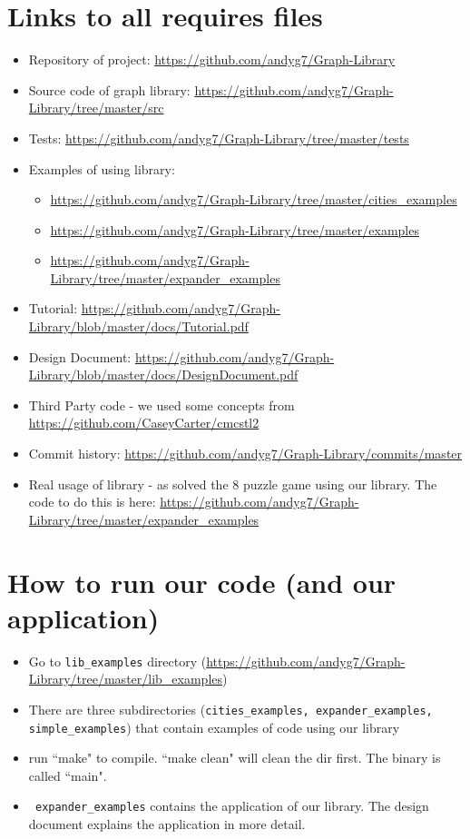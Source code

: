 \documentclass{article}
\begin{document}
\section{Links to all requires files}
\begin{itemize}
\item Repository of project: \url{https://github.com/andyg7/Graph-Library}
\item Source code of graph library: \url{https://github.com/andyg7/Graph-Library/tree/master/src}
\item Tests: \url{https://github.com/andyg7/Graph-Library/tree/master/tests}
\item Examples of using library:
\begin{itemize}
\item \url{https://github.com/andyg7/Graph-Library/tree/master/cities_examples}
\item \url{https://github.com/andyg7/Graph-Library/tree/master/examples}
\item \url{https://github.com/andyg7/Graph-Library/tree/master/expander_examples}
\end{itemize}
\item Tutorial: \url{https://github.com/andyg7/Graph-Library/blob/master/docs/Tutorial.pdf}
\item Design Document: \url{https://github.com/andyg7/Graph-Library/blob/master/docs/DesignDocument.pdf}
\item Third Party code - we used some concepts from \url{https://github.com/CaseyCarter/cmcstl2}
\item Commit history: \url{https://github.com/andyg7/Graph-Library/commits/master}
\item Real usage of library - as solved the 8 puzzle game using our library. The code to do this is here:  \url{https://github.com/andyg7/Graph-Library/tree/master/expander_examples}
\end{itemize}

\section{How to run our code (and our application)}
\begin{itemize}
\item Go to \texttt{lib\_examples} directory (\url{https://github.com/andyg7/Graph-Library/tree/master/lib_examples})
\item There are three subdirectories (\texttt{cities\_examples, expander\_examples, simple\_examples}) that contain examples of code using our library
\item run ``make" to compile. ``make clean" will clean the dir first. The binary is called ``main".
\item \texttt{ expander\_examples} contains the application of our library. The design document explains the application in more detail.  
\end{itemize}
\end{document}
